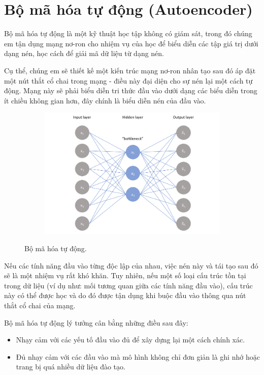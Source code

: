 \section{Bộ mã hóa tự động (Autoencoder)}

Bộ mã hóa tự động là một kỹ thuật học tập không có giám sát,
trong đó chúng em tận dụng mạng nơ-ron cho nhiệm vụ của học để biểu diễn các tập
giá trị dưới dạng nén, học cách để giải mã dữ liệu từ dạng nén.

Cụ thể, chúng em sẽ thiết kế một kiến trúc mạng nơ-ron nhân tạo sau đó áp đặt một
nút thắt cổ chai trong mạng - điều này đại diện cho sự nén lại một cách tự động.
Mạng này sẽ phải biểu diễn tri thức đầu vào dưới dạng các biểu diễn trong ít
chiều không gian hơn, đây chính là biểu diễn nén của đầu vào.

\begin{figure}
    \begin{subfigure}{0.8\textwidth}
        \includegraphics[width=1.0\linewidth]{Chapters/items/autoencoder1.png}
        \caption{}
        \label{fig: auto1}
    \end{subfigure}
    \caption{Bộ mã hóa tự động.}
\end{figure}

\newpage
Nếu các tính năng đầu vào từng độc lập của nhau, việc nén này và tái tạo sau đó sẽ là
một nhiệm vụ rất khó khăn. Tuy nhiên, nếu một số loại cấu trúc tồn tại trong dữ liệu
(ví dụ như: mối tương quan giữa các tính năng đầu vào), cấu trúc này có thể được
học và do đó được tận dụng khi buộc đầu vào thông qua nút thắt cổ chai của mạng.

Bộ mã hóa tự động lý tưởng cân bằng những điều sau đây:
\begin{itemize}[leftmargin=1.5cm]
    \item Nhạy cảm với các yếu tố đầu vào đủ để xây dựng lại một cách chính xác.
    \item Đủ nhạy cảm với các đầu vào mà mô hình không chỉ đơn giản là ghi
          nhớ hoặc trang bị quá nhiều dữ liệu đào tạo.
\end{itemize}

